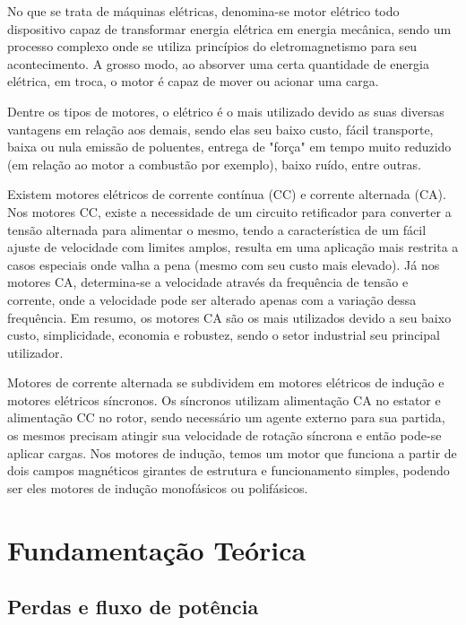 \documentclass[a4paper,12pt,oneside]{article}
\begin{document}
No que se trata de máquinas elétricas, denomina-se motor elétrico todo dispositivo capaz de transformar energia elétrica em energia mecânica, sendo um processo complexo onde se utiliza princípios do eletromagnetismo para seu acontecimento. A grosso modo, ao absorver uma certa quantidade de energia elétrica, em troca, o motor é capaz de mover ou acionar uma carga.

Dentre os tipos de motores, o elétrico é o mais utilizado devido as suas diversas vantagens em relação aos demais, sendo elas seu baixo custo, fácil transporte, baixa ou nula emissão de poluentes, entrega de "força" em tempo muito reduzido (em relação ao motor a combustão por exemplo), baixo ruído, entre outras.

Existem motores elétricos de corrente contínua (CC) e corrente alternada (CA). Nos motores CC, existe a necessidade de um circuito retificador para converter a tensão alternada para alimentar o mesmo, tendo a característica de um fácil ajuste de velocidade com limites amplos, resulta em uma aplicação mais restrita a casos especiais onde valha a pena (mesmo com seu custo mais elevado). Já nos motores CA, determina-se a velocidade através da frequência de tensão e corrente, onde a velocidade pode ser alterado apenas com a variação dessa frequência. Em resumo, os motores CA são os mais utilizados devido a seu baixo custo, simplicidade, economia e robustez, sendo o setor industrial seu principal utilizador. 

Motores de corrente alternada se subdividem em motores elétricos de indução e motores elétricos síncronos. Os síncronos utilizam alimentação CA no estator e alimentação CC no rotor, sendo necessário um agente externo para sua partida, os mesmos precisam atingir sua velocidade de rotação síncrona e então pode-se aplicar cargas. Nos motores de indução, temos um motor que funciona a partir de dois campos magnéticos girantes de estrutura e funcionamento simples, podendo ser eles motores de indução monofásicos ou polifásicos.

\newpage
\section{Fundamentação Teórica}\hspace{0pt}

\subsection{Perdas e fluxo de potência}\hspace{0pt}
\end{document}
